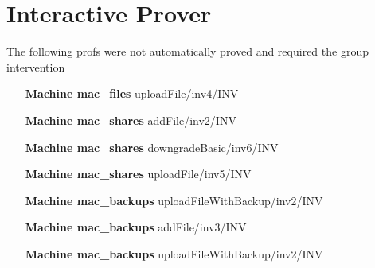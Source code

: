 \documentclass[paper=a4, fontsize=11pt]{scrartcl} %
\numberwithin{equation}{section} %
\numberwithin{figure}{section} %
\numberwithin{table}{section} %
\begin{document}
\section{Interactive Prover}
The following profs were not automatically proved and required the group intervention
\begin{multicols}{2}
\begin{itemize}
	\item[\textbf{Machine mac\_files}] uploadFile/inv4/INV
	\item[\textbf{Machine mac\_shares}] addFile/inv2/INV
	\item[\textbf{Machine mac\_shares}] downgradeBasic/inv6/INV
	\item[\textbf{Machine mac\_shares}] uploadFile/inv5/INV
	\item[\textbf{Machine mac\_backups}] uploadFileWithBackup/inv2/INV
	\item[\textbf{Machine mac\_backups}] addFile/inv3/INV
	\item[\textbf{Machine mac\_backups}] uploadFileWithBackup/inv2/INV
	\item[]
\end{itemize}
\end{multicols}
\end{document}
